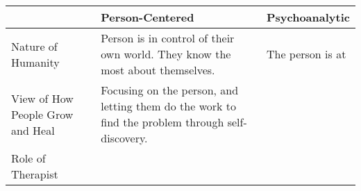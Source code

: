 \begin{landscape}
\begin{table}[htbp]
    \centering
    \begin{tabular}{p{4cm}p{5cm}p{5cm}}
        \toprule
         & Person-Centered & Psychoanalytic \\ \midrule
        Nature of Humanity & Person is in control of their own world. They know the most about themselves. & The person is at  \\ \midrule
        View of How People Grow and Heal & Focusing on the person, and letting them do the work to find the problem through self-discovery. & \\ \midrule
        Role of Therapist &  &  \\
        \bottomrule
    \end{tabular}
\end{table}
\end{landscape}